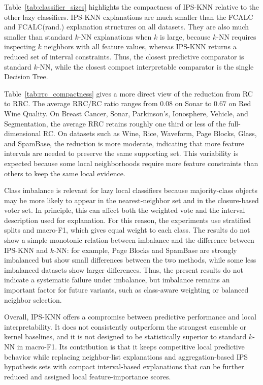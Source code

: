 \documentclass[a4paper,fleqn]{cas-sc}
\begin{document}
Table~\ref{tab:classifier_sizes} highlights the compactness of IPS-KNN relative to the other lazy classifiers. IPS-KNN explanations are much smaller than the FCALC and FCALC(rand.) explanation structures on all datasets. They are also much smaller than standard \(k\)-NN explanations when \(k\) is large, because \(k\)-NN requires inspecting \(k\) neighbors with all feature values, whereas IPS-KNN returns a reduced set of interval constraints. Thus, the closest predictive comparator is standard \(k\)-NN, while the closest compact interpretable comparator is the single Decision Tree.

Table~\ref{tab:rrc_compactness} gives a more direct view of the reduction from RC to RRC. The average RRC/RC ratio ranges from \(0.08\) on Sonar to \(0.67\) on Red Wine Quality. On Breast Cancer, Sonar, Parkinson's, Ionosphere, Vehicle, and Segmentation, the average RRC retains roughly one third or less of the full-dimensional RC. On datasets such as Wine, Rice, Waveform, Page Blocks, Glass, and SpamBase, the reduction is more moderate, indicating that more feature intervals are needed to preserve the same supporting set. This variability is expected because some local neighborhoods require more feature constraints than others to keep the same local evidence.

Class imbalance is relevant for lazy local classifiers because majority-class objects may be more likely to appear in the nearest-neighbor set and in the closure-based voter set. In principle, this can affect both the weighted vote and the interval description used for explanation. For this reason, the experiments use stratified splits and macro-F1, which gives equal weight to each class. The results do not show a simple monotonic relation between imbalance and the difference between IPS-KNN and \(k\)-NN: for example, Page Blocks and SpamBase are strongly imbalanced but show small differences between the two methods, while some less imbalanced datasets show larger differences. Thus, the present results do not indicate a systematic failure under imbalance, but imbalance remains an important factor for future variants, such as class-aware weighting or balanced neighbor selection.

Overall, IPS-KNN offers a compromise between predictive performance and local interpretability. It does not consistently outperform the strongest ensemble or kernel baselines, and it is not designed to be statistically superior to standard \(k\)-NN in macro-F1. Its contribution is that it keeps competitive local predictive behavior while replacing neighbor-list explanations and aggregation-based IPS hypothesis sets with compact interval-based explanations that can be further reduced and assigned local feature-importance scores.
\end{document}
